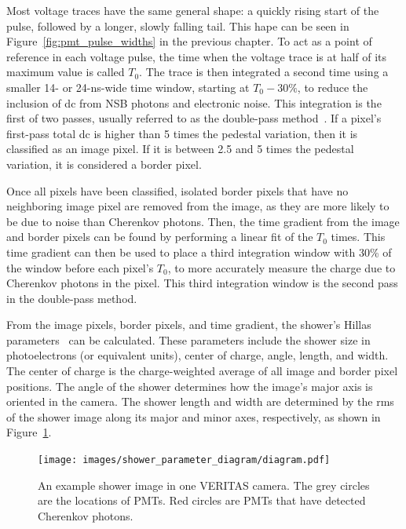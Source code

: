 Most voltage traces have the same general shape: a quickly rising start of the pulse, followed by a longer, slowly falling tail.
This hape can be seen in Figure~\ref{fig:pmt_pulse_widths} in the previous chapter.
To act as a point of reference in each voltage pulse, the time when the voltage trace is at half of its maximum value is called $T_{0}$.
The trace is then integrated a second time using a smaller 14- or 24-ns-wide time window, starting at $T_0 - 30\%$, to reduce the inclusion of dc from NSB photons and electronic noise.
This integration is the first of two passes, usually referred to as the double-pass method~\cite{doublepass}.
If a pixel's first-pass total dc is higher than 5 times the pedestal variation, then it is classified as an image pixel.
If it is between 2.5 and 5 times the pedestal variation, it is considered a border pixel.

Once all pixels have been classified, isolated border pixels that have no neighboring image pixel are removed from the image, as they are more likely to be due to noise than Cherenkov photons.
Then, the time gradient from the image and border pixels can be found by performing a linear fit of the $T_{0}$ times.
This time gradient can then be used to place a third integration window 
with 30\% of the window before each pixel's $T_{0}$, to more accurately measure the charge due to Cherenkov photons in the pixel.
This third integration window is the second pass in the double-pass method.

From the image pixels, border pixels, and time gradient, the shower's Hillas parameters~\cite{hillas_params} can be calculated.
These parameters include the shower size in photoelectrons (or equivalent units), center of charge, angle, length, and width.
The center of charge is the charge-weighted average of all image and border pixel positions.
The angle of the shower determines how the image's major axis is oriented in the camera.
The shower length and width are determined by the rms of the shower image along its major and minor axes, respectively, as shown in Figure~\ref{fig:shower_param}.
  
\begin{figure}[t]
  \centering
  \texttt{[image: images/shower\_parameter\_diagram/diagram.pdf]}
  \caption[Basic Shower Diagram]{
    An example shower image in one VERITAS camera.
    The grey circles are the locations of PMTs.
    Red circles are PMTs that have detected Cherenkov photons.
  }
  \label{fig:shower_param}
\end{figure}
\FloatBarrier

